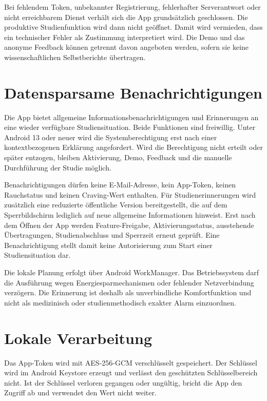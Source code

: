 Bei fehlendem Token, unbekannter Registrierung, fehlerhafter Serverantwort oder nicht erreichbarem Dienst verhält sich die App grundsätzlich geschlossen. Die produktive Studienfunktion wird dann nicht geöffnet. Damit wird vermieden, dass ein technischer Fehler als Zustimmung interpretiert wird. Die Demo und das anonyme Feedback können getrennt davon angeboten werden, sofern sie keine wissenschaftlichen Selbstberichte übertragen.

\section{Datensparsame Benachrichtigungen}

Die App bietet allgemeine Informationsbenachrichtigungen und Erinnerungen an eine wieder verfügbare Studiensituation. Beide Funktionen sind freiwillig. Unter Android 13 oder neuer wird die Systemberechtigung  erst nach einer kontextbezogenen Erklärung angefordert. Wird die Berechtigung nicht erteilt oder später entzogen, bleiben Aktivierung, Demo, Feedback und die manuelle Durchführung der Studie möglich.

Benachrichtigungen dürfen keine E-Mail-Adresse, kein App-Token, keinen Rauchstatus und keinen Craving-Wert enthalten. Für Studienerinnerungen wird zusätzlich eine reduzierte öffentliche Version bereitgestellt, die auf dem Sperrbildschirm lediglich auf neue allgemeine Informationen hinweist. Erst nach dem Öffnen der App werden Feature-Freigabe, Aktivierungsstatus, ausstehende Übertragungen, Studienabschluss und Sperrzeit erneut geprüft. Eine Benachrichtigung stellt damit keine Autorisierung zum Start einer Studiensituation dar.

Die lokale Planung erfolgt über Android WorkManager. Das Betriebssystem darf die Ausführung wegen Energiesparmechanismen oder fehlender Netzverbindung verzögern. Die Erinnerung ist deshalb als unverbindliche Komfortfunktion und nicht als medizinisch oder studienmethodisch exakter Alarm einzuordnen.

\section{Lokale Verarbeitung}

Das App-Token wird mit AES-256-GCM verschlüsselt gespeichert. Der Schlüssel wird im Android Keystore erzeugt und verlässt den geschützten Schlüsselbereich nicht. Ist der Schlüssel verloren gegangen oder ungültig, bricht die App den Zugriff ab und verwendet den Wert nicht weiter.

